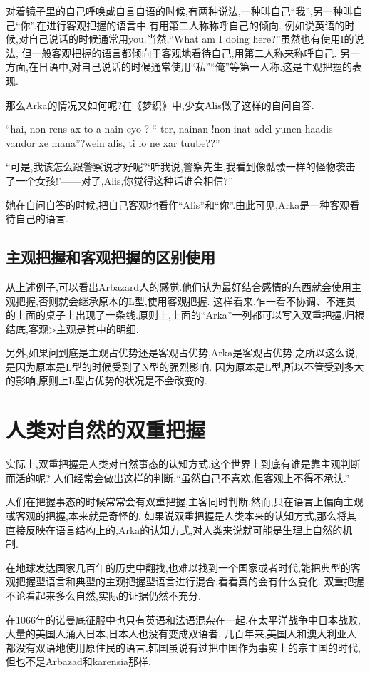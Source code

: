 对着镜子里的自己呼唤或自言自语的时候,有两种说法,一种叫自己``我'',另一种叫自己``你''.在进行客观把握的语言中,有用第二人称称呼自己的倾向.
例如说英语的时候,对自己说话的时候通常用you.当然,``What am I doing here?''虽然也有使用I的说法,
但一般客观把握的语言都倾向于客观地看待自己,用第二人称来称呼自己.
另一方面,在日语中,对自己说话的时候通常使用``私''``俺''等第一人称.这是主观把握的表现.

那么Arka的情况又如何呢?在《梦织》中,少女Alis做了这样的自问自答.

{\kaishu 
``hai, non rens ax to a nain eyo ? `` ter, nainan !non inat adel yunen haadis vandor xe mana''?wein alis, ti lo ne xar tuube??''

``可是,我该怎么跟警察说才好呢?‘听我说,警察先生,我看到像骷髅一样的怪物袭击了一个女孩!’——对了,Alis,你觉得这种话谁会相信?''
}

她在自问自答的时候,把自己客观地看作``Alis''和``你''.由此可见,Arka是一种客观看待自己的语言.


\subsection{主观把握和客观把握的区别使用}
从上述例子,可以看出Arbazard人的感觉.他们认为最好结合感情的东西就会使用主观把握,否则就会继承原本的L型,使用客观把握.
这样看来,乍一看不协调、不连贯的上面的桌子上出现了一条线.原则上,上面的``Arka''一列都可以写入双重把握.归根结底,客观>主观是其中的明细.

另外,如果问到底是主观占优势还是客观占优势,Arka是客观占优势.之所以这么说,是因为原本是L型的时候受到了N型的强烈影响.
因为原本是L型,所以不管受到多大的影响,原则上L型占优势的状况是不会改变的.


\section{人类对自然的双重把握}
实际上,双重把握是人类对自然事态的认知方式.这个世界上到底有谁是靠主观判断而活的呢?
人们经常会做出这样的判断:``虽然自己不喜欢,但客观上不得不承认.''

人们在把握事态的时候常常会有双重把握,主客同时判断.然而,只在语言上偏向主观或客观的把握,本来就是奇怪的.
如果说双重把握是人类本来的认知方式,那么将其直接反映在语言结构上的,Arka的认知方式,对人类来说就可能是生理上自然的机制.

在地球发达国家几百年的历史中翻找,也难以找到一个国家或者时代,能把典型的客观把握型语言和典型的主观把握型语言进行混合,看看真的会有什么变化.
双重把握不论看起来多么自然,实际的证据仍然不充分.

在1066年的诺曼底征服中也只有英语和法语混杂在一起.在太平洋战争中日本战败,大量的美国人涌入日本,日本人也没有变成双语者.
几百年来,美国人和澳大利亚人都没有双语地使用原住民的语言.韩国虽说有过把中国作为事实上的宗主国的时代,但也不是Arbazad和karensia那样.

